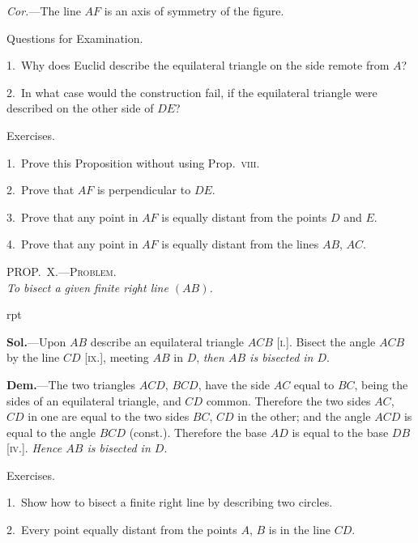 \documentclass[oneside]{book}
\newcommand\myprop[2]{
\bigskip\Needspace*{4\baselineskip}\begin{center}\textsc{#1}\\\medskip\emph{#2}\par\end{center}
}
\newcommand\exhead[1]{
\Needspace*{5\baselineskip}\begin{center}
\textsf{#1}
\end{center}
}
\newcommand\imgflow[3]{
\setcounter{wrapwidth}{#1}
\begin{wrapfigure}[#2]{r}{\value{wrapwidth}pt}
\begin{center}
\vspace{-0.3in}
\end{center}
\end{wrapfigure}
}
\begin{document}
\emph{Cor.}---The line $AF$ is an axis of symmetry of the
figure.

\exhead{Questions for Examination.}

\begin{footnotesize}
1.~Why does Euclid describe the equilateral triangle on the
side remote from $A$?

2.~In what case would the construction fail, if the equilateral
triangle were described on the other side of $DE$?
\par\end{footnotesize}

\exhead{Exercises.}

\begin{footnotesize}
1.~Prove this Proposition without using Prop.~\textsc{viii.}

2.~Prove that $AF$ is perpendicular to $DE$.

3.~Prove that any point in $AF$ is equally distant from the
points $D$ and $E$.

4.~Prove that any point in $AF$ is equally distant from the lines
$AB$, $AC$.
\par\end{footnotesize}



\myprop{PROP\@.~X.---Problem.}{To bisect a given finite right line $(AB)$.}

\imgflow{100}{9}{f025}

\textbf{Sol.}---Upon $AB$ describe an equilateral triangle $ACB$
[\textsc{i.}]. Bisect the angle $ACB$ by the
line $CD$ [\textsc{ix.}], meeting $AB$ in $D$, \emph{then
$AB$ is bisected in $D$}.

\textbf{Dem.}---The two triangles $ACD$,
$BCD$, have the side $AC$ equal to $BC$,
being the sides of an equilateral
triangle, and $CD$ common. Therefore
the two sides $AC$, $CD$ in one
are equal to the two sides $BC$, $CD$ in the other; and the
angle $ACD$ is equal to the angle $BCD$ (const.). Therefore
the base $AD$ is equal to the base $DB$ [\textsc{iv.}]. \emph{Hence
$AB$ is bisected in $D$}.

\exhead{Exercises.}

\begin{footnotesize}
1.~Show how to bisect a finite right line by describing two
circles.

2.~Every point equally distant from the points $A$, $B$ is in the
line $CD$.
\par\end{footnotesize}
\end{document}
